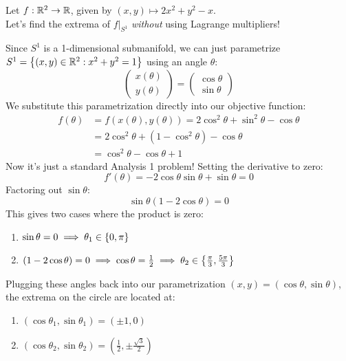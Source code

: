 \begin{example*}
Let $f: \mathbb{R}^2 \to \mathbb{R}$, given by $(x,y) \mapsto 2x^2 + y^2 - x$. \\
Let's find the extrema of $f|_{S^1}$ \emph{without} using Lagrange multipliers!

Since $S^1$ is a 1-dimensional submanifold, we can just parametrize $S^1 = \left\{ (x,y) \in \mathbb{R}^2 : x^2 + y^2 = 1 \right\}$ using an angle $\theta$:
\[ \begin{pmatrix} x(\theta) \\ y(\theta) \end{pmatrix} = \begin{pmatrix} \cos\theta \\ \sin\theta \end{pmatrix} \]
We substitute this parametrization directly into our objective function:
\begin{equation}
    \begin{aligned}
        f(\theta) &= f(x(\theta), y(\theta)) = 2\cos^2\theta + \sin^2\theta - \cos\theta \\
        &= 2\cos^2\theta + (1 - \cos^2\theta) - \cos\theta \\
        &= \cos^2\theta - \cos\theta + 1
    \end{aligned}
\end{equation}
Now it's just a standard Analysis 1 problem! Setting the derivative to zero:
\[ f'(\theta) = -2\cos\theta\sin\theta + \sin\theta = 0 \]
Factoring out $\sin\theta$:
\[ \sin\theta(1 - 2\cos\theta) = 0 \]
This gives two cases where the product is zero:
\begin{enumerate}
    \item $\sin\theta = 0 \implies \theta_1 \in \left\{ 0, \pi \right\}$
    \item $(1 - 2\cos\theta) = 0 \implies \cos\theta = \frac{1}{2} \implies \theta_2 \in \left\{ \frac{\pi}{3}, \frac{5\pi}{3} \right\}$
\end{enumerate}
Plugging these angles back into our parametrization $(x,y) = (\cos\theta, \sin\theta)$, the extrema on the circle are located at:
\begin{enumerate}
    \item $(\cos\theta_1, \sin\theta_1) = (\pm 1, 0)$
    \item $(\cos\theta_2, \sin\theta_2) = \left(\frac{1}{2}, \pm\frac{\sqrt{3}}{2}\right)$
\end{enumerate}
\end{example*}

\hrulefill

